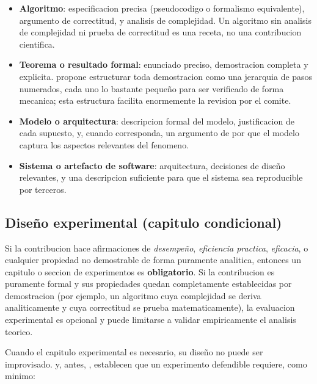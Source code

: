\documentclass[11pt]{article}
\begin{document}
\begin{itemize}
  \item \textbf{Algoritmo}: especificacion precisa (pseudocodigo o
  formalismo equivalente), argumento de correctitud, y analisis de
  complejidad. Un algoritmo sin analisis de complejidad ni prueba de
  correctitud es una receta, no una contribucion cientifica.
  \item \textbf{Teorema o resultado formal}: enunciado preciso, demostracion
  completa y explicita. \citet{lamport1995write} propone estructurar toda
  demostracion como una jerarquia de pasos numerados, cada uno lo bastante
  pequeño para ser verificado de forma mecanica; esta estructura facilita
  enormemente la revision por el comite.
  \item \textbf{Modelo o arquitectura}: descripcion formal del modelo,
  justificacion de cada supuesto, y, cuando corresponda, un argumento
  de por que el modelo captura los aspectos relevantes del fenomeno.
  \item \textbf{Sistema o artefacto de software}: arquitectura, decisiones de
  diseño relevantes, y una descripcion suficiente para que el sistema sea
  reproducible por terceros.
\end{itemize}

\subsection{Diseño experimental (capitulo condicional)}

\begin{cajaNota}
Si la contribucion hace afirmaciones de \emph{desempeño}, \emph{eficiencia
practica}, \emph{eficacia}, o cualquier propiedad no demostrable de forma
puramente analitica, entonces un capitulo o seccion de experimentos es
\textbf{obligatorio}. Si la contribucion es puramente formal y sus
propiedades quedan completamente establecidas por demostracion (por ejemplo,
un algoritmo cuya complejidad se deriva analiticamente y cuya correctitud se
prueba matematicamente), la evaluacion experimental es opcional y puede
limitarse a validar empiricamente el analisis teorico.
\end{cajaNota}

Cuando el capitulo experimental es necesario, su diseño no puede ser
improvisado. \citet{wohlin2012experimentation} y, antes, \citet[metodologia
seminal en ingenieria de software]{basili1986experimentation}, establecen
que un experimento defendible requiere, como minimo:
\end{document}
